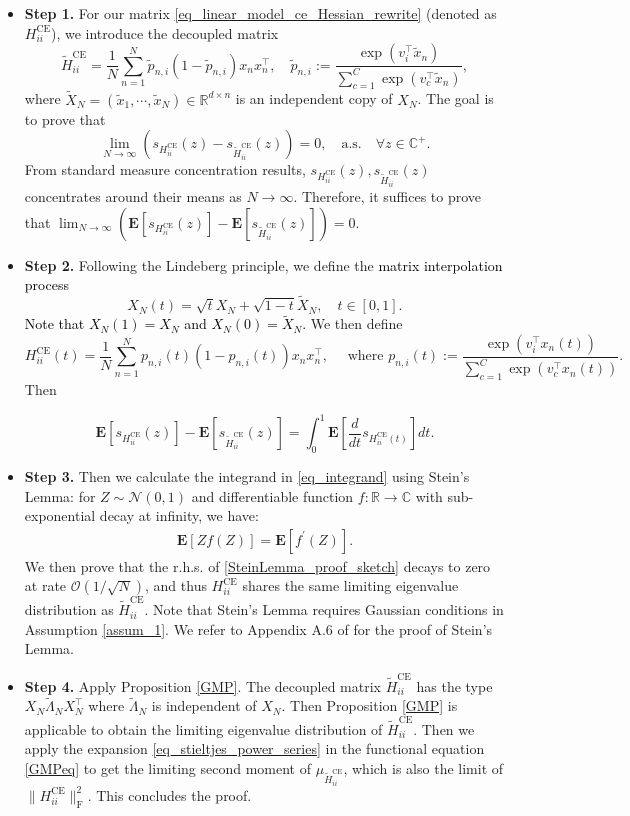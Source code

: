 \documentclass{article}
\newcommand{\R}{\mathbb{R}}
\newcommand{\E}{\mathbf{E}}
\newcommand{\mb}{\mathbb}
\newcommand\ml{\mathcal}
\newcommand{\wt}{\widetilde}
\newcommand{\rw}{\rightarrow}
\newcommand{\1}{^{(1)}}
\newcommand{\2}{^{(2)}}
\renewcommand{\l}{\left}
\renewcommand{\r}{\right}
\newcommand{\be}{\begin{equation}}
\newcommand{\ee}{\end{equation}}
\newcommand{\bea}{\begin{equation}\begin{aligned}}
\newcommand{\eea}{\end{aligned}\end{equation}}
\newcommand{\zhaoruirevise}[1]{\textcolor{black}{ #1}}
\begin{document}
\begin{itemize}
[topsep=1pt,parsep=1pt,partopsep=1pt, leftmargin=*]
    \item {\bf Step 1.} For our matrix \eqref{eq_linear_model_ce_Hessian_rewrite} (denoted as ${H}_{ii}^{\text{CE}}$),
we introduce the decoupled matrix
\be
\wt{H}_{ii}^{\text{CE}} = \frac{1}{N}\sum_{n= 1}^N  \wt{p}_{n,i} (1-\wt{p}_{n,i}) x_n x_n^\top,\quad \wt{p}_{n,i}:=\frac{\exp({v_i^\top \wt{x}_n})}{\sum_{c=1}^C\exp({v_c^\top \wt{x}_n})},
\ee
where $\wt{X}_N=(\wt{x}_1,\cdots,\wt{x}_N)\in\R^{d\times n}$ is an independent copy of $X_N$. The goal is to prove that 
$$
\lim_{N\rw\infty} \l(s_{{H}_{ii}^{\text{CE}}}(z)-s_{\wt{H}_{ii}^{\text{CE}}}(z)\r)=0,\quad \text{a.s.}\quad \forall z\in \mb{C}^+.
$$
From standard measure concentration results, $s_{{H}_{ii}^{\text{CE}}}(z),s_{\wt{H}_{ii}^{\text{CE}}}(z)$ concentrates around their means as $N\rw\infty$. Therefore, it suffices to prove that
$\lim_{N\rw\infty} \l(\E[s_{{H}_{ii}^{\text{CE}}}(z)]-\E[s_{\wt{H}_{ii}^{\text{CE}}}(z)]\r)=0$.
\item {\bf Step 2.} Following  the Lindeberg principle, we 
define the \zhaoruirevise{matrix interpolation process} 
$$
X_N(t)=\sqrt{t} X_N + \sqrt{1-t}\wt{X}_N,\quad t\in [0,1].
$$
\zhaoruirevise{Note that $X_N(1)=X_N$ and $X_N(0)=\wt{X}_N$.} We then define
$$
{H}_{ii}^{\text{CE}}(t) = \frac{1}{N}\sum_{n= 1}^N  {p}_{n,i}(t) (1-{p}_{n,i}(t)) x_n x_n^\top,\quad \text{ where }   {p}_{n,i}(t):=\frac{\exp({v_i^\top {x}_n(t)})}{\sum_{c=1}^C\exp({v_c^\top {x}_n(t)})}.
$$
Then

\be \label{eq_integrand}
\E[s_{{H}_{ii}^{\text{CE}}}(z)]-\E[s_{\wt{H}_{ii}^{\text{CE}}}(z)]=\int_0^1\E\l[\frac{d}{dt}s_{{H}_{ii}^{\text{CE}}(t)}\r]dt.
\ee
\item {\bf Step 3.} Then we calculate the integrand in \eqref{eq_integrand} using Stein's  Lemma:   for  $Z\sim \ml{N}(0,1)$ and differentiable function $f:\mb{R}\rw\mb{C}$ with sub-exponential decay at infinity, we have: 
\bea\label{SteinLemma_proof_sketch}
    \E[Zf(Z)]= \E[f^\prime(Z)].
    \eea
    We then prove that the r.h.s. of  \eqref{SteinLemma_proof_sketch} decays to zero at rate  $\mathcal{O}(1/\sqrt{N})$, and thus ${H}_{ii}^{\text{CE}}$ shares the same limiting eigenvalue distribution as $\wt{H}_{ii}^{\text{CE}}$. 
 Note that Stein's Lemma requires Gaussian conditions in Assumption \ref{assum_1}. We refer to Appendix A.6 of \citep{Talagrandbook} for the proof of Stein's Lemma.
\item {\bf Step 4.} Apply Proposition \ref{GMP}. The decoupled matrix $\wt{H}_{ii}^{\text{CE}}$ has the type $X_N\wt{\Lambda}_NX_N^\top$ where $\wt{\Lambda}_N$ is independent of $X_N$. Then Proposition \ref{GMP} is applicable to obtain the limiting eigenvalue distribution of $\wt{H}_{ii}^{\text{CE}}$. Then we apply the expansion \eqref{eq_stieltjes_power_series} in the functional equation \eqref{GMPeq} to get the limiting second moment of $\mu_{\wt{H}_{ii}^{\text{CE}}}$, which is also the limit of $\|{H}_{ii}^{\text{CE}}\|_\text{F}^2$. This concludes  the proof.
\end{itemize}
\end{document}
